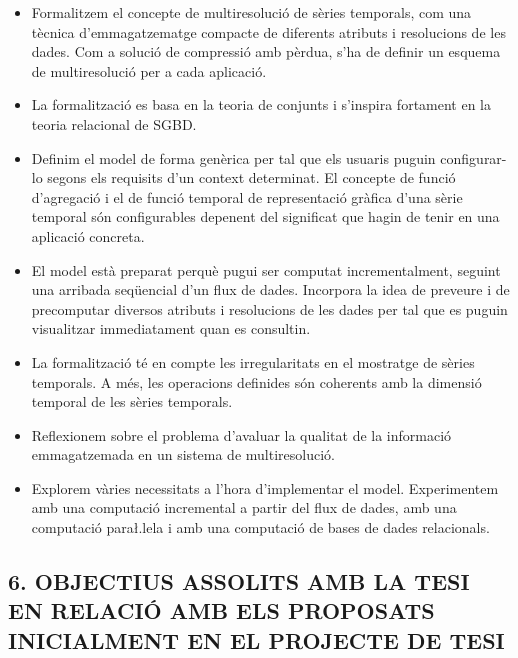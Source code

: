 \documentclass{scrartcl}
\begin{document}
\begin{itemize}
\item Formalitzem el concepte de multiresolució de sèries temporals,
  com una tècnica d'emmagatzematge compacte de diferents atributs i
  resolucions de les dades. Com a solució de compressió amb pèrdua,
  s'ha de definir un esquema de multiresolució per a cada aplicació.


\item La formalització es basa en la teoria de conjunts i s'inspira
  fortament en la teoria relacional de SGBD.

\item Definim el model de forma genèrica per tal que els usuaris
  puguin configurar-lo segons els requisits d'un context determinat.
  El concepte de funció d'agregació i el de funció temporal de
  representació gràfica d'una sèrie temporal són configurables
  depenent del significat que hagin de tenir en una aplicació
  concreta.

\item El model està preparat perquè pugui ser computat
  incrementalment, seguint una arribada seqüencial d'un flux de dades.
  Incorpora la idea de preveure i de precomputar diversos atributs i
  resolucions de les dades per tal que es puguin visualitzar immediatament
  quan es consultin.

\item La formalització té en compte les irregularitats en el mostratge de
  sèries temporals. A més, les operacions definides són coherents amb
  la dimensió temporal de les sèries temporals. 


\item Reflexionem sobre el problema d'avaluar la qualitat de la
  informació emmagatzemada en un sistema de multiresolució.


\item Explorem vàries necessitats a l'hora d'implementar el
  model. Experimentem amb una computació incremental a partir del flux
  de dades, amb una computació para\l.lela i amb una
  computació de bases de dades relacionals.


\end{itemize}



\subsection*{6. OBJECTIUS ASSOLITS AMB LA TESI EN RELACIÓ AMB ELS PROPOSATS INICIALMENT EN EL PROJECTE DE TESI}
\end{document}
